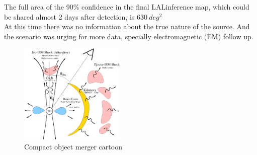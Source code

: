 \documentclass[10pt]{beamer}
\begin{document}
\begin{frame}
The full area of the 90\% confidence in the final LALinference map, 
which could be shared almost 2 days after detection, is $630 \ deg^2$\\
At this time there was no information about the true nature of the source.
And the scenario was urging for more data, specially electromagnetic (EM)
follow up.\\

\begin{figure}
 \includegraphics[width=0.45\textwidth]{./slides/plots/cartoon.jpg}
 \caption{\scriptsize{Compact object merger cartoon}}
\end{figure}
\end{frame}
\end{document}
